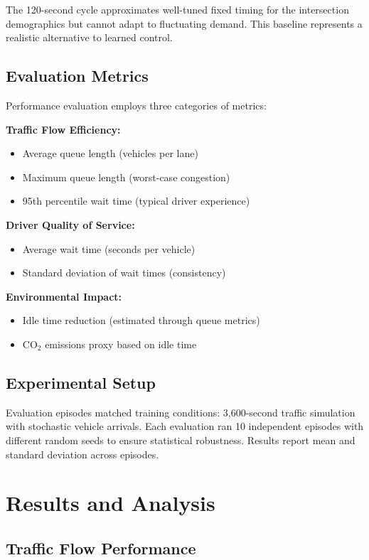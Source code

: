 \documentclass[10pt,conference]{IEEEtran}
\begin{document}
The 120-second cycle approximates well-tuned fixed timing for the intersection demographics but cannot adapt to fluctuating demand. This baseline represents a realistic alternative to learned control.

\subsection{Evaluation Metrics}

Performance evaluation employs three categories of metrics:

\textbf{Traffic Flow Efficiency:} 
\begin{itemize}
    \item Average queue length (vehicles per lane)
    \item Maximum queue length (worst-case congestion)
    \item 95th percentile wait time (typical driver experience)
\end{itemize}

\textbf{Driver Quality of Service:}
\begin{itemize}
    \item Average wait time (seconds per vehicle)
    \item Standard deviation of wait times (consistency)
\end{itemize}

\textbf{Environmental Impact:}
\begin{itemize}
    \item Idle time reduction (estimated through queue metrics)
    \item CO$_2$ emissions proxy based on idle time
\end{itemize}

\subsection{Experimental Setup}

Evaluation episodes matched training conditions: 3,600-second traffic simulation with stochastic vehicle arrivals. Each evaluation ran 10 independent episodes with different random seeds to ensure statistical robustness. Results report mean and standard deviation across episodes.

\section{Results and Analysis}

\subsection{Traffic Flow Performance}
\end{document}
